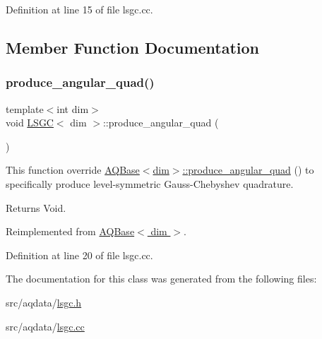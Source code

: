Definition at line 15 of file lsgc.\+cc.



\subsection{Member Function Documentation}
\mbox{\label{class_l_s_g_c_a1d135fb9ca12a9b65b8cc397479fc4d7}} 
\subsubsection{\texorpdfstring{produce\+\_\+angular\+\_\+quad()}{produce\_angular\_quad()}}
{\footnotesize\ttfamily template$<$int dim$>$ \\
void \hyperlink{class_l_s_g_c}{L\+S\+GC}$<$ dim $>$\+::produce\+\_\+angular\+\_\+quad (\begin{DoxyParamCaption}{ }\end{DoxyParamCaption})\hspace{0.3cm}{\ttfamily [virtual]}}

This function override \hyperlink{class_a_q_base_a16c7871be0da6c112f547f39d50258fd}{A\+Q\+Base$<$dim$>$\+::produce\+\_\+angular\+\_\+quad} () to specifically produce level-\/symmetric Gauss-\/\+Chebyshev quadrature.

\begin{DoxyReturn}{Returns}
Void. 
\end{DoxyReturn}


Reimplemented from \hyperlink{class_a_q_base_a16c7871be0da6c112f547f39d50258fd}{A\+Q\+Base$<$ dim $>$}.



Definition at line 20 of file lsgc.\+cc.



The documentation for this class was generated from the following files\+:\begin{DoxyCompactItemize}
\item 
src/aqdata/\hyperlink{lsgc_8h}{lsgc.\+h}\item 
src/aqdata/\hyperlink{lsgc_8cc}{lsgc.\+cc}\end{DoxyCompactItemize}
